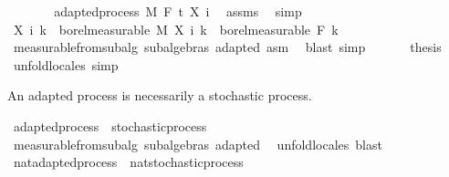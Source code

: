 \begin{isabellebody}
\ \ \ \ \isamarkupfalse%
\ \isamarkupfalse%
\ adapted{\isacharunderscore}{\kern0pt}process\ M\ F\ t\ {\isachardoublequoteopen}X\ i{\isachardoublequoteclose}\ \isamarkupfalse%
\ assms\ \isamarkupfalse%
\ simp\isanewline
\ \ \ \ \isamarkupfalse%
\ {\isachardoublequoteopen}X\ i\ k\ {\isasymin}\ borel{\isacharunderscore}{\kern0pt}measurable\ M{\isachardoublequoteclose}\ {\isachardoublequoteopen}X\ i\ k\ {\isasymin}\ borel{\isacharunderscore}{\kern0pt}measurable\ {\isacharparenleft}{\kern0pt}F\ k{\isacharparenright}{\kern0pt}{\isachardoublequoteclose}\ \isamarkupfalse%
\ measurable{\isacharunderscore}{\kern0pt}from{\isacharunderscore}{\kern0pt}subalg\ subalgebras\ adapted\ asm\ \isamarkupfalse%
\ {\isacharparenleft}{\kern0pt}blast{\isacharcomma}{\kern0pt}\ simp{\isacharparenright}{\kern0pt}\isanewline
\ \ \isacommand{{\isacharbraceright}{\kern0pt}}\isamarkupfalse%
\isanewline
\ \ \isamarkupfalse%
\ {\isacharquery}{\kern0pt}thesis\ \isamarkupfalse%
\ {\isacharparenleft}{\kern0pt}unfold{\isacharunderscore}{\kern0pt}locales{\isacharparenright}{\kern0pt}\ simp\isanewline
{}\isamarkupfalse%
%
\endisatagproof
{\isafoldproof}%
%
\isadelimproof
%
\endisadelimproof
%
\begin{isamarkuptext}%
An adapted process is necessarily a stochastic process.%
\end{isamarkuptext}\isamarkuptrue%
\isamarkupfalse%
\ adapted{\isacharunderscore}{\kern0pt}process\ {\isasymsubseteq}\ stochastic{\isacharunderscore}{\kern0pt}process%
\isadelimproof
\ %
\endisadelimproof
%
\isatagproof
{}\isamarkupfalse%
\ measurable{\isacharunderscore}{\kern0pt}from{\isacharunderscore}{\kern0pt}subalg\ subalgebras\ adapted\ \isamarkupfalse%
\ {\isacharparenleft}{\kern0pt}unfold{\isacharunderscore}{\kern0pt}locales{\isacharparenright}{\kern0pt}\ blast%
\endisatagproof
{\isafoldproof}%
%
\isadelimproof
%
\endisadelimproof
\isanewline
\isanewline
{}\isamarkupfalse%
\ nat{\isacharunderscore}{\kern0pt}adapted{\isacharunderscore}{\kern0pt}process\ {\isasymsubseteq}\ nat{\isacharunderscore}{\kern0pt}stochastic{\isacharunderscore}{\kern0pt}process%
\isadelimproof
\ %
\endisadelimproof
%
\isatagproof
\isacommand{{\isachardot}{\kern0pt}{\isachardot}{\kern0pt}}\isamarkupfalse%
%
\endisatagproof
{\isafoldproof}%
%
\isadelimproof
%
\endisadelimproof
\isanewline
{}\isamarkupfalse%

\end{isabellebody}
